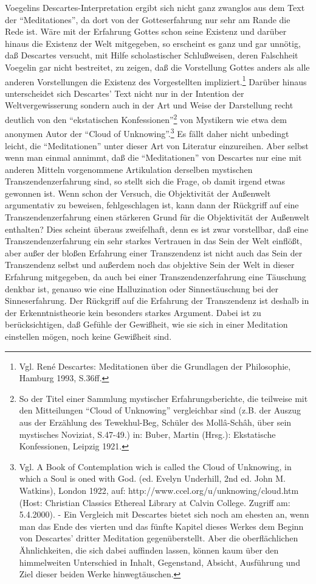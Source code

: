 Voegelins Descartes-Interpretation ergibt sich nicht ganz zwanglos aus
dem Text der "`Meditationes"', da dort von der Gotteserfahrung nur sehr
am Rande die Rede ist. Wäre mit der Erfahrung Gottes schon seine
Existenz und darüber hinaus die Existenz der Welt mitgegeben, so
erscheint es ganz und gar unnötig, daß Descartes versucht, mit Hilfe
scholastischer Schlußweisen, deren Falschheit Voegelin gar nicht
bestreitet, zu zeigen, daß die Vorstellung Gottes anders als alle
anderen Vorstellungen die Existenz des Vorgestellten
impliziert.\footnote{Vgl. René Descartes: Meditationen über die
  Grundlagen der Philosophie, Hamburg 1993, S.36ff.} Darüber hinaus
unterscheidet sich Descartes' Text nicht nur in der Intention der
Weltvergewisserung sondern auch in der Art und Weise der Darstellung
recht deutlich von den "`ekstatischen Konfessionen"'\footnote{So der
  Titel einer Sammlung mystischer Erfahrungsberichte, die teilweise mit
  den Mitteilungen "`Cloud of Unknowing"' vergleichbar sind (z.B. der
  Auszug aus der Erzählung des Tewekhul-Beg, Schüler des
  Mollâ-Schâh, über sein mystisches Noviziat, S.47-49.) in:
  Buber, Martin (Hrsg.): Ekstatische Konfessionen, Leipzig 1921.} von
Mystikern wie etwa dem anonymen Autor der "`Cloud of
Unknowing"'.\footnote{Vgl. A Book of Contemplation wich is called the
  Cloud of Unknowing, in which a Soul is oned with God. (ed. Evelyn
  Underhill, 2nd ed.  John M. Watkins), London 1922, auf:
  http://www.ccel.org/u/unknowing/cloud.htm (Host: Christian Classics
  Ethereal Library at Calvin College. Zugriff am: 5.4.2000). - Ein
  Vergleich mit Descartes bietet sich noch am ehesten an, wenn man das
  Ende des vierten und das fünfte Kapitel dieses Werkes dem Beginn von
  Descartes' dritter Meditation gegenüberstellt. Aber die
  oberflächlichen Ähnlichkeiten, die sich dabei auf\/finden lassen,
  können kaum über den himmelweiten Unterschied in Inhalt, Gegenstand,
  Absicht, Ausführung und Ziel dieser beiden Werke hinwegtäuschen.} Es
fällt daher nicht unbedingt leicht, die "`Meditationen"' unter dieser
Art von Literatur einzureihen. Aber selbst wenn man einmal annimmt, daß
die "`Meditationen"' von Descartes nur eine mit anderen Mitteln
vorgenommene Artikulation derselben mystischen Transzendenzerfahrung
sind, so stellt sich die Frage, ob damit irgend etwas gewonnen ist. Wenn
schon der Versuch, die Objektivität der Außenwelt argumentativ zu
beweisen, fehlgeschlagen ist, kann dann der Rückgriff auf eine
Transzendenzerfahrung einen stärkeren Grund für die Objektivität der
Außenwelt enthalten? Dies scheint überaus zweifelhaft, denn es ist zwar
vorstellbar, daß eine Transzendenzerfahrung ein sehr starkes Vertrauen
in das Sein der Welt einflößt, aber außer der bloßen Erfahrung einer
Transzendenz ist nicht auch das Sein der Transzendenz selbst und
außerdem noch das objektive Sein der Welt in dieser Erfahrung
mitgegeben, da auch bei einer Transzendenzerfahrung eine Täuschung
denkbar ist, genauso wie eine Halluzination oder Sinnestäuschung bei der
Sinneserfahrung. Der Rückgriff auf die Erfahrung der Transzendenz ist
deshalb in der Erkenntnistheorie kein besonders starkes Argument. Dabei
ist zu berücksichtigen, daß Gefühle der Gewißheit, wie sie sich in einer
Meditation einstellen mögen, noch keine Gewißheit sind.

